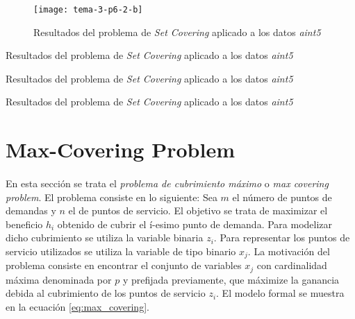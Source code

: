 \documentclass[spanish]{article}
\begin{document}
			\begin{figure}[h]
				\begin{center}
					\texttt{[image: tema-3-p6-2-b]}
				\end{center}
				\caption{Resultados del problema de \emph{Set Covering} aplicado a los datos \emph{aint5}}
				\label{fig:sol-6.2b}
			\end{figure}

			\begin{table}[h]
				\begin{center}
				\end{center}
				\caption{Resultados del problema de \emph{Set Covering} aplicado a los datos \emph{aint5}}
				\label{table:sol-6.2b1}
			\end{table}

			\begin{table}[h]
				\begin{center}
				\end{center}
				\caption{Resultados del problema de \emph{Set Covering} aplicado a los datos \emph{aint5}}
				\label{table:sol-6.2b2}
			\end{table}

			\begin{table}[h]
				\begin{center}
				\end{center}
				\caption{Resultados del problema de \emph{Set Covering} aplicado a los datos \emph{aint5}}
				\label{table:sol-6.2b3}
			\end{table}

	\section{Max-Covering Problem}
	\label{sec:e-7}

		\paragraph{}
		En esta sección se trata el \emph{problema de cubrimiento máximo} o \emph{max covering problem}. El problema consiste en lo siguiente: Sea $m$ el número de puntos de demandas y $n$ el de puntos de servicio. El objetivo se trata de maximizar el beneficio $h_i$ obtenido de cubrir el í-esimo punto de demanda. Para modelizar dicho cubrimiento se utiliza la variable binaria $z_i$. Para representar los puntos de servicio utilizados se utiliza la variable de tipo binario $x_j$. La motivación del problema consiste en encontrar el conjunto de variables $x_j$ con cardinalidad máxima denominada por $p$ y prefijada previamente, que máximize la ganancia debida al cubrimiento de los puntos de servicio $z_i$. El modelo formal se muestra en la ecuación \eqref{eq:max_covering}.
\end{document}
